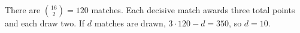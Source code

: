 There are $\binom{16}{2}=120$ matches. Each decisive match awards three total points and each draw two. If $d$ matches are drawn, $3\cdot120-d=350$, so $\boxed{d=10}$.
